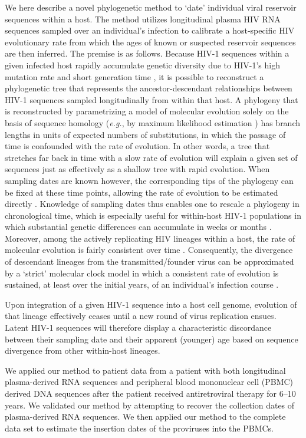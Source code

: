 \documentclass[10pt,twocolumn,twoside]{pnas-new}
\begin{document}
We here describe a novel phylogenetic method to `date' individual viral reservoir sequences within a host.
The method utilizes longitudinal plasma HIV RNA sequences sampled over an individual's infection to calibrate a host-specific HIV evolutionary rate from which the ages of known or suspected reservoir sequences are then inferred. The premise is as follows.
Because HIV-1 sequences within a given infected host rapidly accumulate genetic diversity due to HIV-1's high mutation rate and short generation time \cite{Alizon13,Rambaut04,Shankarappa99}, it is possible to reconstruct a phylogenetic tree that represents the ancestor-descendant relationships between HIV-1 sequences sampled longitudinally from within that host.
A phylogeny that is reconstructed by parametrizing a model of molecular evolution solely on the basis of sequence homology (\emph{e.g.}, by maximum likelihood estimation \cite{Felsenstein81}) has branch lengths in units of expected numbers of substitutions, in which the passage of time is confounded with the rate of evolution.
In other words, a tree that stretches far back in time with a slow rate of evolution will explain a given set of sequences just as effectively as a shallow tree with rapid evolution.
When sampling dates are known however, the corresponding tips of the phylogeny can be fixed at these time points, allowing the rate of evolution to be estimated directly \cite{Rodrigo99}.
Knowledge of sampling dates thus enables one to rescale a phylogeny in chronological time, which is especially useful for within-host HIV-1 populations in which substantial genetic differences can accumulate in weeks or months \cite{Williamson03}.
Moreover, among the actively replicating HIV lineages within a host, the rate of molecular evolution is fairly consistent over time \cite{Korber00,Kuhner95,Leitner99,Park16}.
Consequently, the divergence of descendant lineages from the transmitted/founder virus can be approximated by a `strict' molecular clock model in which a consistent rate of evolution is sustained, at least over the initial years, of an individual's infection course \cite{Keele08}. 

Upon integration of a given HIV-1 sequence into a host cell genome, evolution of that lineage effectively ceases until a new round of virus replication ensues.
Latent HIV-1 sequences will therefore display a characteristic discordance between their sampling date and their apparent (younger) age based on sequence divergence from other within-host lineages.

We applied our method to patient data from a patient with both longitudinal plasma-derived RNA sequences and peripheral blood mononuclear cell (PBMC) derived DNA sequences after the patient received antiretroviral therapy for 6--10 years.
We validated our method by attempting to recover the collection dates of plasma-derived RNA sequences.
We then applied our method to the complete data set to estimate the insertion dates of the proviruses into the PBMCs.
\end{document}
